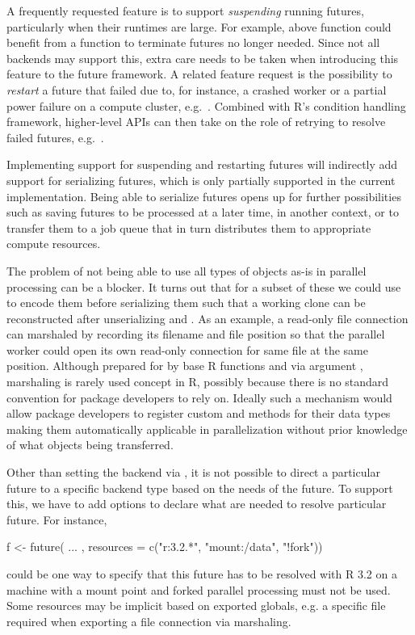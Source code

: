 A frequently requested feature is to support \emph{suspending} running
futures, particularly when their runtimes are large.  For example,
above  function could benefit from
a  function to terminate futures no longer needed.
Since not all backends may support
this, extra care needs to be taken when introducing this feature to
the future framework.  A related feature request is the possibility
to \emph{restart} a future that failed due to, for instance, a crashed
worker or a partial power failure on a compute cluster,
e.g.\ .  Combined with R's condition handling
framework, higher-level APIs can then take on the role of retrying to
resolve failed futures,
e.g.\ .

Implementing support for suspending and restarting futures will
indirectly add support for serializing futures, which is only
partially supported in the current implementation.  Being able to
serialize futures opens up for further possibilities such as saving
futures to be processed at a later time, in another context, or to
transfer them to a job queue that in turn distributes them to
appropriate compute resources.

The problem of not being able to use all types of objects as-is in
parallel processing can be a blocker.  It turns out that for a subset
of these we could use  to encode them before
serializing them such that a working clone can be reconstructed after
unserializing and .  As an example, a read-only file
connection can marshaled by recording its filename and file position
so that the parallel worker could open its own read-only connection
for same file at the same position.  Although prepared for by base R
functions  and  via
argument , marshaling is rarely used concept in R,
possibly because there is no standard convention for package
developers to rely on. Ideally such a mechanism would allow package
developers to register custom  and 
methods for their data types making them automatically applicable in
parallelization without prior knowledge of what objects being
transferred.

Other than setting the backend via , it is not possible
to direct a particular future to a specific backend type based on the
needs of the future.  To support this, we have to add options to
declare what  are needed to resolve particular future.
For instance,
\begin{example}
f <- future({ ... }, resources = c("r:3.2.*", "mount:/data", "!fork"))
\end{example}
%
could be one way to specify that this future has to be resolved with R
3.2 on a machine with a  mount point and forked parallel
processing must not be used.  Some resources may be implicit based on
exported globals, e.g. a specific file required when exporting a file
connection via marshaling.

